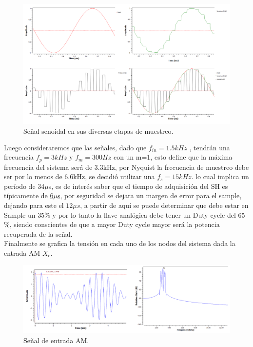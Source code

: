 \begin{figure}[H]
	\centering
	\includegraphics[width=1\textwidth]{ImagenesEjercicio7/t1.PNG}
\caption{Señal senoidal en sus diversas etapas de muestreo.}
	\label{fig:muestreo}
\end{figure}
Luego consideraremos que las señales, dado que $f_{in} = 1.5kHz$ , tendrán una frecuencia $f_p=3kHz$ y $f_m=300Hz$ con un m=1, esto define que la máxima frecuencia del sistema será de 3.3kHz, por Nyquist la frecuencia de muestreo debe ser por lo menos de 6.6kHz, se decidió utilizar una $f_s = 15kHz$. lo cual implica un período de 34$\mu$s, es de interés saber que el tiempo de adquisición  del SH es típicamente de \href{http://www.ti.com/lit/ds/symlink/lf398-n-mil.pdf}{6$\mu$s}, por seguridad se dejara un margen de error para el sample, dejando para este el $12\mu s$, a partir de aquí se puede determinar que debe estar en Sample un 35$\%$ y por lo tanto la llave analógica debe tener un Duty cycle del 65$\%$, siendo conscientes de que a mayor Duty cycle mayor será la potencia recuperada de la señal.
\\
Finalmente se grafica la tensión en cada uno de los nodos del sistema dada la entrada AM $X_c$.
\begin{figure}[H]
	\centering
	\includegraphics[width=1\textwidth]{ImagenesEjercicio7/input.PNG}
\caption{Señal de entrada AM.}
	\label{fig:input}
\end{figure}
